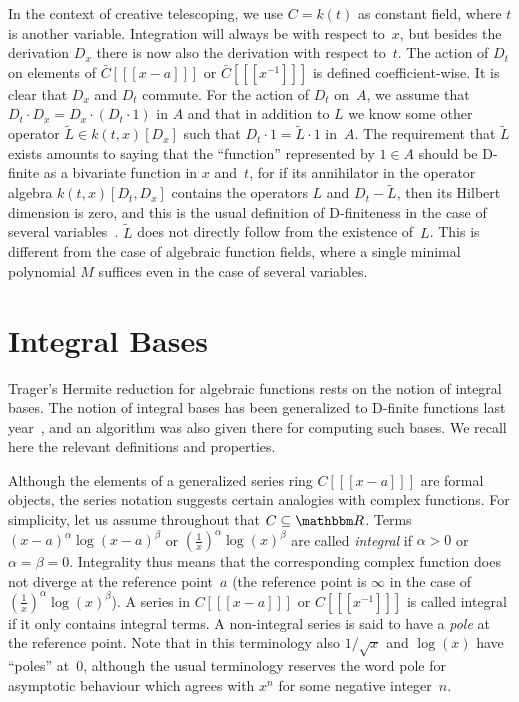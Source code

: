 \documentclass{sig-alternate}
\let\set\mathbbm
\begin{document}
In the context of creative telescoping, we use $C=k(t)$ as constant field, where
$t$ is another variable. Integration will always be with respect to~$x$, but
besides the derivation $D_x$ there is now also the derivation with respect
to~$t$. The action of $D_t$ on elements of $\bar C[[[x-a]]]$ or $\bar
C[[[x^{-1}]]]$ is defined coefficient-wise. It is clear that $D_x$ and $D_t$
commute. For the action of $D_t$ on~$A$, we assume that $D_t\cdot D_x = D_x\cdot
(D_t\cdot 1)$ in $A$ and that in addition to $L$ we know some other operator $\tilde
L\in k(t,x)[D_x]$ such that $D_t\cdot 1=\tilde L\cdot 1$ in~$A$. The requirement
that $\tilde L$ exists amounts to saying that the ``function'' represented by
$1\in A$ should be D-finite as a bivariate function in $x$ and~$t$, for if its
annihilator in the operator algebra $k(t,x)[D_t,D_x]$ contains the operators $L$
and $D_t-\tilde L$, then its Hilbert dimension is zero, and this is the usual
definition of D-finiteness in the case of several variables~\cite{zeilberger90,chyzak98,koutschan09,kauers14c}.
$\tilde L$ does not directly follow from the existence of~$L$. This is different
from the case of algebraic function fields, where a single minimal polynomial $M$
suffices even in the case of several variables.

\section{Integral Bases}

Trager's Hermite reduction for algebraic functions rests on the notion of
integral bases. The notion of integral bases has been generalized to D-finite
functions last year~\cite{kauers15b}, and an algorithm was also given there for
computing such bases. We recall here the relevant definitions and properties.

Although the elements of a generalized series ring $C[[[x-a]]]$ are formal
objects, the series notation suggests certain analogies with complex
functions.  For simplicity, let us assume throughout that $C\subseteq\set
R$. Terms $(x-a)^\alpha\log(x-a)^\beta$ or $(\tfrac1x)^\alpha\log(x)^\beta$ are
called \emph{integral} if $\alpha>0$ or $\alpha=\beta=0$.
Integrality thus means that the corresponding complex
function does not diverge at the reference point~$a$ (the reference point is
$\infty$ in the case of $(\tfrac1x)^\alpha\log(x)^\beta$). A series in
$C[[[x-a]]]$ or $C[[[x^{-1}]]]$ is called integral if it only contains integral
terms. A non-integral series is said to have a \emph{pole} at the reference
point.  Note that in this terminology also $1/\sqrt{x}$ and $\log(x)$ have
``poles'' at~$0$, although the usual terminology reserves the word pole for
asymptotic behaviour which agrees with $x^n$ for some negative integer~$n$.
\end{document}
